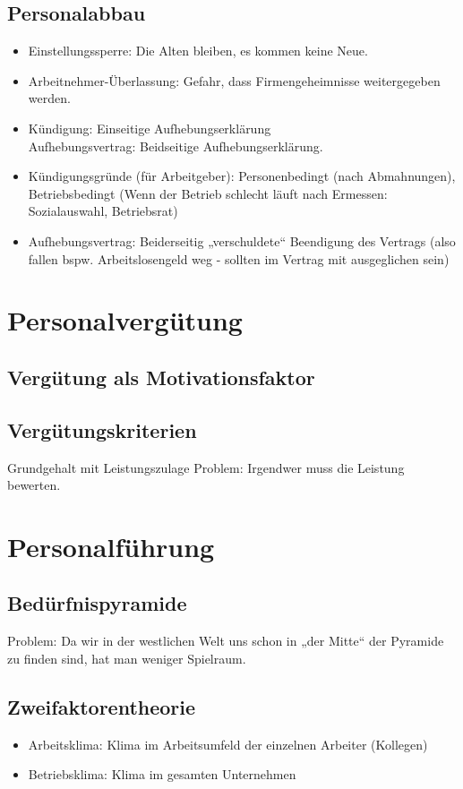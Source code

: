 \subsection{Personalabbau}
\begin{itemize}
\item Einstellungssperre: Die Alten bleiben, es kommen keine Neue.
\item Arbeitnehmer-Überlassung: Gefahr, dass Firmengeheimnisse weitergegeben werden.
\item Kündigung: Einseitige Aufhebungserklärung\\
Aufhebungsvertrag: Beidseitige Aufhebungserklärung.
\item Kündigungsgründe (für Arbeitgeber): Personenbedingt (nach Abmahnungen), Betriebsbedingt (Wenn der Betrieb schlecht läuft nach Ermessen: Sozialauswahl, Betriebsrat)
\item Aufhebungsvertrag: Beiderseitig „verschuldete“ Beendigung des Vertrags (also fallen bspw. Arbeitslosengeld weg - sollten im Vertrag mit ausgeglichen sein)
\end{itemize}
\section{Personalvergütung}
\subsection{Vergütung als Motivationsfaktor}
\subsection{Vergütungskriterien}
Grundgehalt mit Leistungszulage Problem: Irgendwer muss die Leistung bewerten.
\section{Personalführung}
\subsection{Bedürfnispyramide}
Problem: Da wir in der westlichen Welt uns schon in „der Mitte“ der Pyramide zu finden sind, hat man weniger Spielraum.
\subsection{Zweifaktorentheorie}
\begin{itemize}
\item Arbeitsklima: Klima im Arbeitsumfeld der einzelnen Arbeiter (Kollegen)
\item Betriebsklima: Klima im gesamten Unternehmen
\end{itemize}
